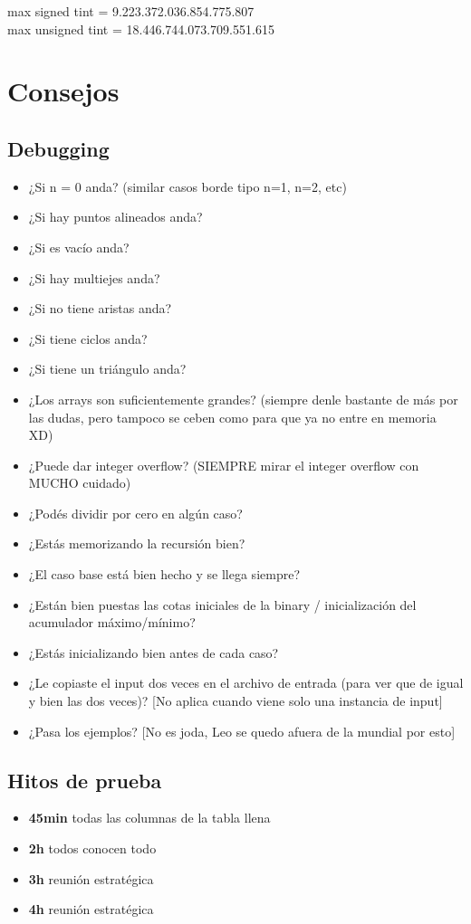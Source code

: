 \documentclass{article}
\begin{document}
\begin{multicols*}{2}
max signed tint = 9.223.372.036.854.775.807 \\
max unsigned tint = 18.446.744.073.709.551.615


\section{Consejos}
\subsection{Debugging}
\begin{itemize}
    \itemsep0em
\item ¿Si n = 0 anda? (similar casos borde tipo n=1, n=2, etc)
\item ¿Si hay puntos alineados anda?
\item ¿Si es vacío anda?
\item ¿Si hay multiejes anda?
\item ¿Si no tiene aristas anda?
\item ¿Si tiene ciclos anda?
\item ¿Si tiene un triángulo anda?

\item ¿Los arrays son suficientemente grandes? (siempre denle bastante de más por las dudas, pero tampoco se ceben como para que ya no entre en memoria XD)
\item ¿Puede dar integer overflow? (SIEMPRE mirar el integer overflow con MUCHO cuidado)
\item ¿Podés dividir por cero en algún caso?
\item ¿Estás memorizando la recursión bien?
\item ¿El caso base está bien hecho y se llega siempre?
\item ¿Están bien puestas las cotas iniciales de la binary / inicialización del acumulador máximo/mínimo?

\item ¿Estás inicializando bien antes de cada caso?
\item ¿Le copiaste el input dos veces en el archivo de entrada (para ver que de igual y bien las dos veces)? [No aplica cuando viene solo una instancia de input]
\item ¿Pasa los ejemplos? [No es joda, Leo se quedo afuera de la mundial por esto]
\end{itemize}
\subsection{Hitos de prueba}
\begin{itemize}
    \item \textbf{45min} todas las columnas de la tabla llena
    \item \textbf{2h} todos conocen todo
    \item \textbf{3h} reunión estratégica
    \item \textbf{4h} reunión estratégica   
\end{itemize}

\end{multicols*}
\end{document}
